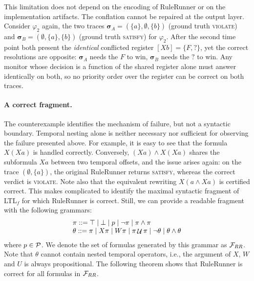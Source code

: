 This limitation does not depend on the encoding of RuleRunner or on the implementation artifacts. 
The conflation cannot be repaired at the output layer. Consider $\varphi_2$ again, the two traces $\boldsymbol{\sigma}_A = (\{a\}, \emptyset, \{b\})$ (ground truth \textsc{violate}) and $\boldsymbol{\sigma}_B = (\emptyset, \{a\}, \{b\})$ (ground truth \textsc{satisfy}) for $\varphi_2$. After the second time point both present the \emph{identical} conflicted register $[Xb] = \{F, ?\}$, yet the correct resolutions are opposite: $\boldsymbol{\sigma}_A$ needs the $F$ to win, $\boldsymbol{\sigma}_B$ needs the $?$ to win. Any monitor whose decision is a function of the shared register alone must answer identically on both, so no priority order over the register can be correct on both traces.

\paragraph{A correct fragment.}
The counterexample identifies the mechanism of failure, but not a syntactic
boundary. Temporal nesting alone is neither necessary nor sufficient for observing the failure presented above. For example, it is easy to see that the formula $X(Xa)$ is handled correctly. Conversely, $(Xa)\land X(Xa)$ shares the subformula $Xa$ between two temporal offsets, and the issue arises again: on the trace
$(\emptyset,\{a\})$, the original RuleRunner returns \textsc{satisfy}, whereas the correct verdict is \textsc{violate}. Note also that the equivalent rewriting $X(a\land Xa)$ is certified correct. This makes complicated to identify the maximal syntactic fragment of LTL$_f$ for which RuleRunner is correct. Still, we can provide a readable fragment with the following grammars:
%
\[
\begin{array}{l}
\pi ::= \top \mid \bot \mid p \mid \neg \pi \mid \pi\land\pi \\
\theta ::= \pi \mid X\pi \mid W\pi \mid \pi\mathop{{\mathcal{U}}}\pi \mid \neg \theta \mid \theta \land \theta
\end{array}
\]
where $p \in {\ensuremath{\mathcal{P}}}$. We denote the set of formulas generated by this grammar as ${\mathcal{F}}_{RR}$.
Note that $\theta$ cannot contain nested temporal operators, i.e., the argument of $X$, $W$ and $U$ is always propositional. The following theorem shows that RuleRunner is correct for all formulas in ${\mathcal{F}}_{RR}$.

